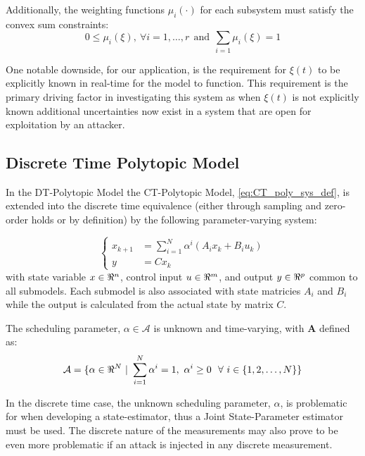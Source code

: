 \documentclass[]{article}
\begin{document}
Additionally, the weighting functions $\mu_i (\cdot)$ for each subsystem must satisfy the convex sum constraints:
\begin{equation}\label{eq:convex_sum_constraints}
	0 \leq \mu_i(\xi), \ \forall i = 1,\dots,r \ \ \text{and} \ \ \sum_{i=1} \mu_i(\xi) = 1
\end{equation}


One notable downside, for our application, is the requirement for $\xi(t)$ to be explicitly known in real-time for the model to function. This requirement is the primary driving factor in investigating this system as when $\xi(t)$ is not explicitly known additional uncertainties now exist in a system that are open for exploitation by an attacker.


\subsection{Discrete Time Polytopic Model}
In the DT-Polytopic Model the CT-Polytopic Model, \eqref{eq:CT_poly_sys_def}, is extended into the discrete time equivalence (either through sampling and zero-order holds or by definition) by the following parameter-varying system:

\begin{equation}\label{eq:DT_poly_sys_def}
	\begin{cases}
		x_{k+1} &= \sum_{i=1}^{N} \alpha^i (A_i x_k + B_i u_k)\\
		y		&= C x_k
	\end{cases}
\end{equation}
with state variable $x \in \real^n$, control input $u \in \real^m$, and output $y \in \real^p$ common to all submodels. Each submodel is also associated with state matricies $A_i$ and $B_i$ while the output is calculated from the actual state by matrix $C$.

The scheduling parameter, $\alpha \in \mathcal{A}$ is unknown and time-varying, with $\mathbf{A}$ defined as:
\begin{equation}\label{eq:alpha_set}
	\mathcal{A} = \{\alpha\in \real^N \ | \ \sum_{i=1}^N \alpha^i = 1, \ \alpha^i \geq 0 \ \ \forall \ i \in \{1,2,\dots,N\}\}
\end{equation}

In the discrete time case, the unknown scheduling parameter, $\alpha$, is problematic for when developing a state-estimator, thus a Joint State-Parameter estimator must be used. The discrete nature of the measurements may also prove to be even more problematic if an attack is injected in any discrete measurement.
\end{document}
